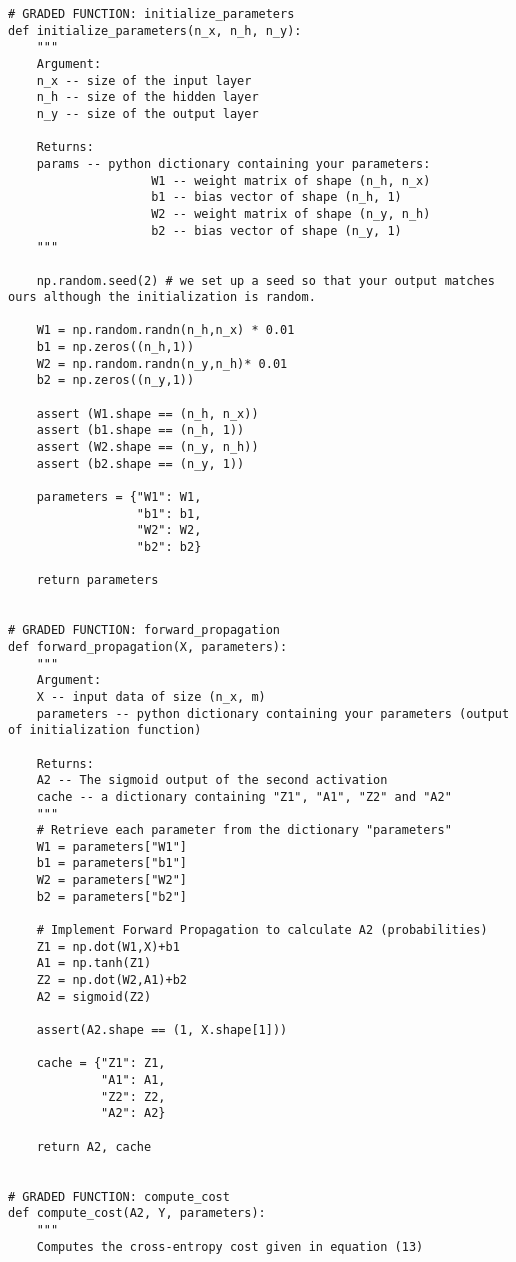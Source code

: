 \begin{verbatim}
# GRADED FUNCTION: initialize_parameters
def initialize_parameters(n_x, n_h, n_y):
    """
    Argument:
    n_x -- size of the input layer
    n_h -- size of the hidden layer
    n_y -- size of the output layer
    
    Returns:
    params -- python dictionary containing your parameters:
                    W1 -- weight matrix of shape (n_h, n_x)
                    b1 -- bias vector of shape (n_h, 1)
                    W2 -- weight matrix of shape (n_y, n_h)
                    b2 -- bias vector of shape (n_y, 1)
    """
    
    np.random.seed(2) # we set up a seed so that your output matches ours although the initialization is random.
    
    W1 = np.random.randn(n_h,n_x) * 0.01
    b1 = np.zeros((n_h,1))
    W2 = np.random.randn(n_y,n_h)* 0.01
    b2 = np.zeros((n_y,1))
    
    assert (W1.shape == (n_h, n_x))
    assert (b1.shape == (n_h, 1))
    assert (W2.shape == (n_y, n_h))
    assert (b2.shape == (n_y, 1))
    
    parameters = {"W1": W1,
                  "b1": b1,
                  "W2": W2,
                  "b2": b2}
    
    return parameters


# GRADED FUNCTION: forward_propagation
def forward_propagation(X, parameters):
    """
    Argument:
    X -- input data of size (n_x, m)
    parameters -- python dictionary containing your parameters (output of initialization function)
    
    Returns:
    A2 -- The sigmoid output of the second activation
    cache -- a dictionary containing "Z1", "A1", "Z2" and "A2"
    """
    # Retrieve each parameter from the dictionary "parameters"
    W1 = parameters["W1"]
    b1 = parameters["b1"]
    W2 = parameters["W2"]
    b2 = parameters["b2"]
    
    # Implement Forward Propagation to calculate A2 (probabilities)
    Z1 = np.dot(W1,X)+b1
    A1 = np.tanh(Z1)
    Z2 = np.dot(W2,A1)+b2
    A2 = sigmoid(Z2)
    
    assert(A2.shape == (1, X.shape[1]))
    
    cache = {"Z1": Z1,
             "A1": A1,
             "Z2": Z2,
             "A2": A2}
    
    return A2, cache


# GRADED FUNCTION: compute_cost
def compute_cost(A2, Y, parameters):
    """
    Computes the cross-entropy cost given in equation (13)
    

\end{verbatim}
